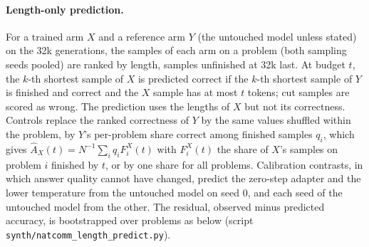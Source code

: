 \documentclass[10pt]{article}
\begin{document}
\paragraph{Length-only prediction.} For a trained arm $X$ and a reference arm $Y$ (the untouched model unless stated) on the 32k generations, the samples of each arm on a problem (both sampling seeds pooled) are ranked by length, samples unfinished at 32k last. At budget $t$, the $k$-th shortest sample of $X$ is predicted correct if the $k$-th shortest sample of $Y$ is finished and correct and the $X$ sample has at most $t$ tokens; cut samples are scored as wrong. The prediction uses the lengths of $X$ but not its correctness. Controls replace the ranked correctness of $Y$ by the same values shuffled within the problem, by $Y$'s per-problem share correct among finished samples $q_i$, which gives $\hat A_X(t)=N^{-1}\sum_i q_i F_i^X(t)$ with $F_i^X(t)$ the share of $X$'s samples on problem $i$ finished by $t$, or by one share for all problems. Calibration contrasts, in which answer quality cannot have changed, predict the zero-step adapter and the lower temperature from the untouched model on seed 0, and each seed of the untouched model from the other. The residual, observed minus predicted accuracy, is bootstrapped over problems as below (script \texttt{synth/natcomm\_length\_predict.py}).
\end{document}
